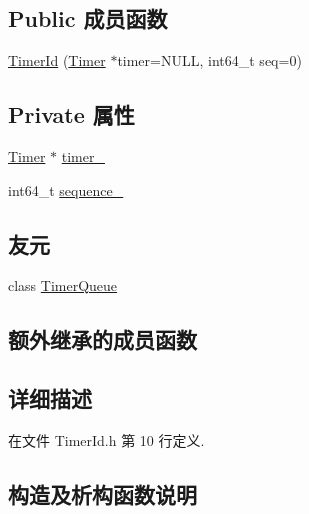 \subsection*{Public 成员函数}
\begin{DoxyCompactItemize}
\item 
\hyperlink{classmuduo_1_1TimerId_aaea1b972b9fa2ba3f7fe7bd5998e72e6}{Timer\+Id} (\hyperlink{classmuduo_1_1Timer}{Timer} $\ast$timer=N\+U\+LL, int64\+\_\+t seq=0)
\end{DoxyCompactItemize}
\subsection*{Private 属性}
\begin{DoxyCompactItemize}
\item 
\hyperlink{classmuduo_1_1Timer}{Timer} $\ast$ \hyperlink{classmuduo_1_1TimerId_ae667852d5ad62e431751ceb013368cb9}{timer\+\_\+}
\item 
int64\+\_\+t \hyperlink{classmuduo_1_1TimerId_a16b9981eba82482428dd663754b65888}{sequence\+\_\+}
\end{DoxyCompactItemize}
\subsection*{友元}
\begin{DoxyCompactItemize}
\item 
class \hyperlink{classmuduo_1_1TimerId_a865df28c10927729363ac18d3d83f35b}{Timer\+Queue}
\end{DoxyCompactItemize}
\subsection*{额外继承的成员函数}


\subsection{详细描述}


在文件 Timer\+Id.\+h 第 10 行定义.



\subsection{构造及析构函数说明}
\mbox{\label{classmuduo_1_1TimerId_aaea1b972b9fa2ba3f7fe7bd5998e72e6}} 
